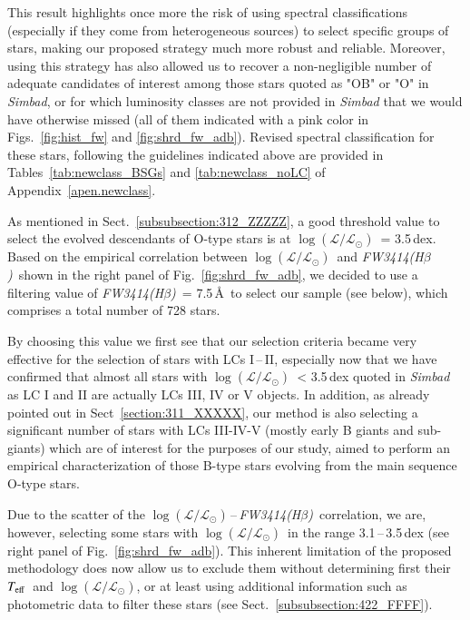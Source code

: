 \documentclass{aa}
\newcommand{\Teff}{\mbox{$T_{\rm eff}$}}
\newcommand{\logLs}{$\log (\mathcal{L}/\mathcal{L}_{\odot})$}
\newcommand{\fwhb}{\textit{FW3414(H$\beta$)}}
\begin{document}
This result highlights once more the risk of using spectral classifications (especially if they come from heterogeneous sources) to select specific groups of stars, making our proposed strategy much more robust and reliable. Moreover, using this strategy has also allowed us to recover a non-negligible number of adequate candidates of interest among those stars quoted as "OB" or "O" in \textit{Simbad}, or for which luminosity classes are not provided in \textit{Simbad} that we would have otherwise missed (all of them indicated with a pink color in Figs.~\ref{fig:hist_fw} and \ref{fig:shrd_fw_adb}). Revised spectral classification for these stars, following the guidelines indicated above are provided in Tables~\ref{tab:newclass_BSGs} and \ref{tab:newclass_noLC} of Appendix~\ref{apen.newclass}. %

As mentioned in Sect.~\ref{subsubsection:312_ZZZZZ}, a good threshold value to select the evolved descendants of O-type stars is at \logLs\ = 3.5\,dex. Based on the empirical correlation between \logLs\ and \fwhb\ shown in the right panel of Fig.~\ref{fig:shrd_fw_adb}, we decided to use a filtering value of \fwhb\ = 7.5\,\AA\ to select our sample (see below), which comprises a total number of 728 stars.

By choosing this value we first see that our selection criteria became very effective for the selection of stars with LCs I\,--\,II, especially now that we have confirmed that almost all stars with \logLs\ < 3.5\,dex quoted in \textit{Simbad} as LC I and II are actually LCs III, IV or V objects. In addition, as already pointed out in Sect~\ref{section:311_XXXXX}, our method is also selecting a significant number of stars with LCs III-IV-V (mostly early B giants and sub-giants) which are of interest for the purposes of our study, aimed to perform an empirical characterization of those B-type stars evolving from the main sequence O-type stars. 

Due to the scatter of the \logLs\,--\,\fwhb\ correlation, we are, however, selecting some stars with \logLs\ in the range 3.1\,--\,3.5\,dex (see right panel of Fig.~\ref{fig:shrd_fw_adb}). This inherent limitation of the proposed methodology does now allow us to exclude them without determining first their \Teff\ and \logLs, or at least using additional information such as photometric data to filter these stars (see Sect.~\ref{subsubsection:422_FFFF}). 
\end{document}
